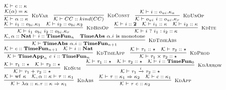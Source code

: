 \documentclass[fleqn]{article}
\begin{document}
\[
\scriptsize
\begin{array}{l}
    \mathcal{K} \vdash c :: \kappa \\
    \infer[\textsc{KdVar}]{\mathcal{K} \vdash \alpha :: \kappa}{\mathcal{K}(\alpha)=\kappa} \hspace{1em}
    \infer[\textsc{KdConst}]{\mathcal{K} \vdash CC :: kind(CC)}{} \hspace{1em}
    \infer[\textsc{KdUnOp}]{\mathcal{K} \vdash o_{ui}~i :: o_{ui}.\kappa_r}{\mathcal{K} \vdash i :: o_{ui}.\kappa_a} \\
    \infer[\textsc{KdBinOp}]{\mathcal{K} \vdash i_1~o_{bi}~i_2 :: o_{bi}.\kappa_r}{\mathcal{K} \vdash i_1 :: o_{bi}.\kappa_1 & \mathcal{K} \vdash i_2 :: o_{bi}.\kappa_2} \hspace{1em}
    \infer[\textsc{KdIte}]{\mathcal{K} \vdash i~?~i_1 : i_2 :: \kappa}{\mathcal{K} \vdash i :: \mathbf{2} & \mathcal{K} \vdash i_1 :: \kappa & \mathcal{K} \vdash i_2 :: \kappa} \\
    \infer[\textsc{KdTimeAbs}]{\mathcal{K} \vdash \mathbf{TimeAbs}~\alpha. i :: \mathbf{TimeFun}_{n + 1}}{\mathcal{K},\alpha :: \mathbf{Nat} \vdash i :: \mathbf{TimeFun}_n & \mathbf{TimeAbs}~\alpha. i~\mathrm{is}~\mathrm{monotone}} \\
    \infer[\textsc{KdTimeApp}]{\mathcal{K} \vdash \mathbf{TimeApp}_n~c~i :: \mathbf{TimeFun}_n}{\mathcal{K} \vdash c :: \mathbf{TimeFun}_{n+1} & \mathcal{K} \vdash i :: \mathbf{Nat}} \hspace{1em}
    \infer[\textsc{KdProd}]{\mathcal{K} \vdash \tau_1 \times \tau_2 :: \star}{\mathcal{K} \vdash \tau_1 :: \star & \mathcal{K} \vdash \tau_2 :: \star} \\
    \infer[\textsc{KdSum}]{\mathcal{K} \vdash \tau_1 + \tau_2 :: \star}{\mathcal{K} \vdash \tau_1 :: \star & \mathcal{K} \vdash \tau_2 :: \star} \hspace{1em}
    \infer[\textsc{KdArrow}]{\mathcal{K} \vdash \tau_1 \xrightarrow{i} \tau_2 :: \star}{\mathcal{K} \vdash \tau_1 :: \star & \mathcal{K} \vdash \tau_2 :: \star & \mathcal{K} \vdash i :: \mathbf{TimeFun}_0} \\
    \infer[\textsc{KdAbs}]{\mathcal{K} \vdash \lambda \alpha :: \kappa. \tau :: \kappa \Rightarrow \kappa_1}{\mathcal{K} \vdash \mathrm{wf}~\kappa & \mathcal{K},\alpha :: \kappa \vdash \tau :: \kappa_1} \hspace{1em}
    \infer[\textsc{KdApp}]{\mathcal{K} \vdash \tau~c :: \kappa_2}{\mathcal{K} \vdash \tau :: \kappa_1 \Rightarrow \kappa_2 & \mathcal{K} \vdash c :: \kappa_1} \\

\end{array}\]
\end{document}
